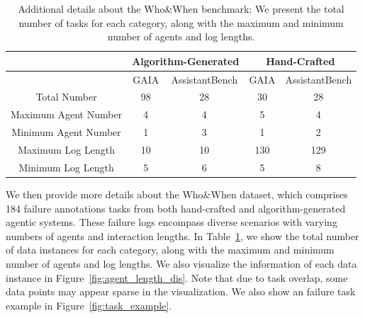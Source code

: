 \begin{table}[htb]
\centering
\vspace{-10pt}
\renewcommand{\arraystretch}{1.0}
\begin{tabular}{ccccc}
\toprule[1.5pt]
                 & \multicolumn{2}{c}{\textbf{Algorithm-Generated}}                       & \multicolumn{2}{c}{\textbf{Hand-Crafted}}                              \\ \hline
\rowcolor{gray!50}                 & \multicolumn{1}{c}{GAIA} & \multicolumn{1}{c}{AssistantBench} & \multicolumn{1}{c}{GAIA} & \multicolumn{1}{c}{AssistantBench} \\ \hline
Total Number     & \multicolumn{1}{c}{98}     & \multicolumn{1}{c}{28}               & \multicolumn{1}{c}{30}     & \multicolumn{1}{c}{28}               \\
Maximum Agent Number &    4                      &                 4                  &                5        &        4                           \\
Minimum Agent Number &     1                     &              3                      &              1            &      2                              \\
Maximum Log Length   &    10                      &      10                              &        130                  &     129                               \\
Minimum Log Length   &     5                     &           6                         &                 5         &     8                               \\ 
\bottomrule[1.5pt]
\end{tabular}
\caption{Additional details about the Who\&When benchmark: We present the total number of tasks for each category, along with the maximum and minimum number of agents and log lengths.}
\label{table:dataset_details}
\vspace{-10pt}
\end{table}

We then provide more details about the Who\&When dataset, which comprises 184 failure annotations tasks from both hand-crafted and algorithm-generated agentic systems. These failure logs encompass diverse scenarios with varying numbers of agents and interaction lengths.
In Table~\ref{table:dataset_details}, we show the total number of data instances for each category, along with the maximum and minimum number of agents and log lengths.
We also visualize the information of each data instance in Figure~\ref{fig:agent_length_dis}.
Note that due to task overlap, some data points may appear sparse in the visualization. We also show an failure task example in Figure~\ref{fig:task_example}.


